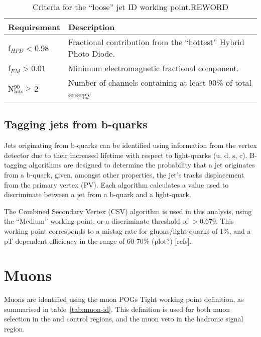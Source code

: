 \begin{table}[!ht]
  \caption{Criteria for the ``loose'' jet ID working point.\label{tab:jet_id_loose}REWORD}
  \footnotesize
  \begin{center}
    \begin{tabular}{ll}
      \hline
      \hline
      Requirement                & Description                                                      \\
      \hline
      f$_{HPD} < 0.98$           & Fractional contribution from the ``hottest'' Hybrid Photo Diode. \\
      f$_{EM} > 0.01$            & Minimum electromagnetic fractional component.                    \\
      N$^{90}_{\rm hits} \geq$ 2 & Number of channels containing at least 90\% of total energy      \\
      \hline
      \hline
    \end{tabular}
  \end{center}
\end{table}


\subsection{Tagging jets from b-quarks}

Jets originating from b-quarks can be identified using information from the 
vertex detector due to their increased lifetime with respect to light-quarks (u,
d, s, c). 
B-tagging algorithms are designed to determine the probability that a jet 
originates from a b-quark, given, amongst other properties, the jet's tracks
displacement from the primary 
vertex (PV). Each algorithm
calculates a value used to discriminate between a jet from a b-quark and a
light-quark.

The Combined Secondary Vertex (CSV) algorithm is used in this analysis,
using the ``Medium'' working point, or a discriminate threshold of $>0.679$. This 
working point corresponds to a mistag rate for gluons/light-quarks of 1\%, and a
pT dependent efficiency in the range of 60-70\% (plot?) [refs].


\section{Muons}  %
\label{sec:objects_muons}
Muons are identified using the muon POGs Tight working point definition, as 
summarised in table~\ref{tab:muon-id}. This definition is used for both muon 
selection in the \mj and \mmj control regions, and the muon veto in the hadronic
signal region.

